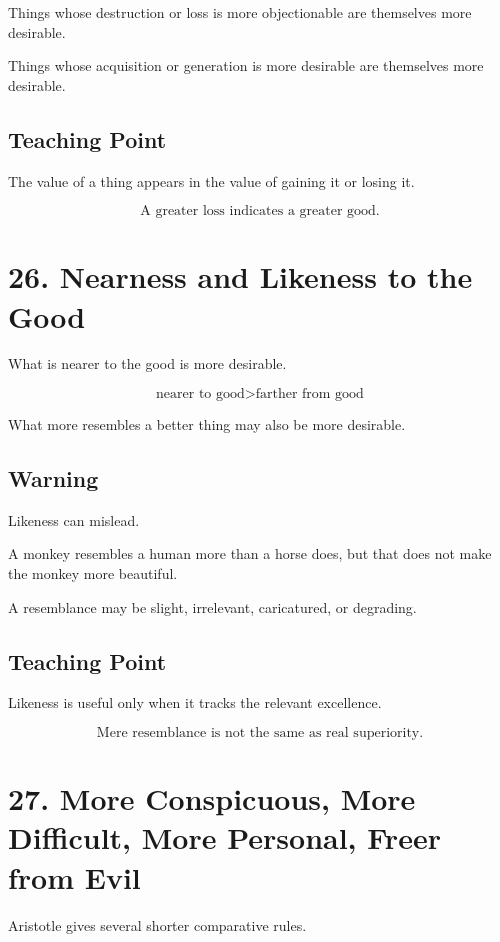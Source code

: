 \documentclass[12pt]{article}
\begin{document}
Things whose destruction or loss is more objectionable are themselves more
desirable.

Things whose acquisition or generation is more desirable are themselves more
desirable.

\subsection*{Teaching Point}

The value of a thing appears in the value of gaining it or losing it.

\[
\boxed{
\text{A greater loss indicates a greater good.}
}
\]

\section*{26. Nearness and Likeness to the Good}

What is nearer to the good is more desirable.

\[
\text{nearer to good} > \text{farther from good}
\]

What more resembles a better thing may also be more desirable.

\subsection*{Warning}

Likeness can mislead.

A monkey resembles a human more than a horse does, but that does not make the
monkey more beautiful.

A resemblance may be slight, irrelevant, caricatured, or degrading.

\subsection*{Teaching Point}

Likeness is useful only when it tracks the relevant excellence.

\[
\boxed{
\text{Mere resemblance is not the same as real superiority.}
}
\]

\section*{27. More Conspicuous, More Difficult, More Personal, Freer from Evil}

Aristotle gives several shorter comparative rules.
\end{document}
